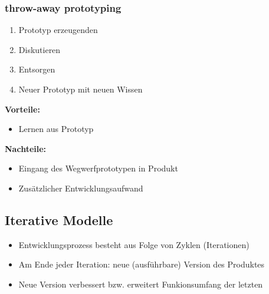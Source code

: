 \documentclass[11pt, a4paper]{article}
\begin{document}
\subsubsection{throw-away prototyping}

\begin{enumerate}
    \item Prototyp erzeugenden
    \item Diskutieren
    \item Entsorgen
    \item Neuer Prototyp mit neuen Wissen
\end{enumerate}

\textbf{Vorteile:}
\begin{itemize}
    \item Lernen aus Prototyp
\end{itemize}

\textbf{Nachteile:}
\begin{itemize}
    \item Eingang des Wegwerfprototypen in Produkt
    \item Zusätzlicher Entwicklungsaufwand
\end{itemize}

\vspace{3em}


\subsection{Iterative Modelle}

\begin{itemize}
    \item Entwicklungsprozess besteht aus Folge von Zyklen (Iterationen)
    \item Am Ende jeder Iteration: neue (ausführbare) Version des Produktes
    \item Neue Version verbessert bzw. erweitert Funkionsumfang der letzten
\end{itemize}
\end{document}
